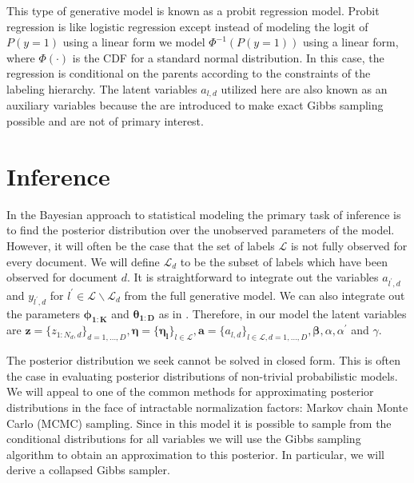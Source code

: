 \documentclass{article}
\begin{document}
%
This type of generative model is known as a probit regression model. Probit regression is like logistic regression except instead of modeling the logit of $P(y = 1)$ using a linear form we model $\Phi^{-1}(P(y = 1))$ using a linear form, where $\Phi(\cdot)$ is the CDF for a standard normal distribution.  In this case, the regression is conditional on the parents according to the constraints of the labeling hierarchy. The latent variables $a_{l,d}$ utilized here are also known as an auxiliary variables because the are introduced to make exact Gibbs sampling possible and are not of primary interest.  
%
\section{Inference}
\label{sec:inference}
%
In the Bayesian approach to statistical modeling the primary task of inference is to find the posterior distribution over the unobserved parameters of the model. However, it will often be the case that the set of labels $\mathcal{L}$ is not fully observed for every document.  We will define $\mathcal{L}_d$ to be the subset of labels which have been observed for document $d$.  It is straightforward to integrate out the variables $a_{l^\prime,d}$ and $y_{l^\prime,d}$ for $l^\prime \in \mathcal{L} \backslash \mathcal{L}_d$ from the full generative model.  We can also integrate out the parameters $\mathbf{\phi_{1:K}}$ and $\mathbf{\theta_{1:D}}$ as in \citet{Griffiths04}.  Therefore, in our model the latent variables are $\mathbf{z} = \{ z_{1:N_d,d} \}_{d = 1, \ldots, D},\mathbf{\eta} = \{ \mathbf{\eta_l} \}_{l \in \mathcal{L}},\mathbf{a} = \{ a_{l,d}\}_{l \in \mathcal{L}, d = 1, \ldots, D}, \mathbf{\beta}, \alpha, \alpha^{\prime}$ and $\gamma$.  

The posterior distribution we seek cannot be solved in closed form. This is often the case in evaluating posterior distributions of non-trivial probabilistic models. We will appeal to one of the common methods for approximating posterior distributions in the face of intractable normalization factors: Markov chain Monte Carlo (MCMC) sampling. Since in this model it is possible to sample from the conditional distributions for all variables we will use the Gibbs sampling algorithm to obtain an approximation to this posterior. In particular, we will derive a collapsed Gibbs sampler.
%
%
%
%
\end{document}
